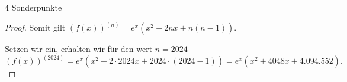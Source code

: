 \documentclass{../problemset}
\begin{document}
\begin{problem}{4 Sonderpunkte}
\begin{proof}
	Somit gilt $(f(x))^{(n)} = e^x(x^2 + 2nx + n(n-1))$.

	Setzen wir ein, erhalten wir für den wert $n = 2024$
	\[
		(f(x))^{(2024)} = e^x(x^2 + 2 \cdot 2024x + 2024 \cdot (2024 - 1)) = e^x(x^2 + 4048x + 4.094.552).
	\]


\end{proof}
\end{problem}
\end{document}
